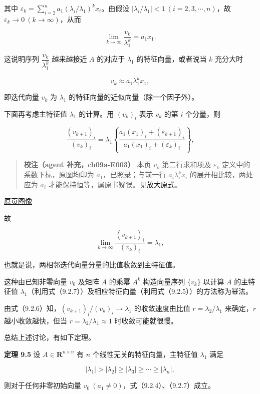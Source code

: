\documentclass[
  10pt,
  fontset=fandol]{ctexart}
\begin{document}
其中 \(\varepsilon_k=\displaystyle\sum_{i=2}^na_1(\lambda_i/\lambda_1)^kx_i\)。由假设 \(|\lambda_i/\lambda_1|<1\ (i=2,3,\cdots,n)\)，故 \(\varepsilon_k\to0\ (k\to\infty)\)，从而

\[
\lim_{k\to\infty}\frac{v_k}{\lambda_1^k}=a_1x_1.
\tag{9.2.4}
\]

这说明序列 \(\dfrac{v_k}{\lambda_1^k}\) 越来越接近 \(A\) 的对应于 \(\lambda_1\) 的特征向量，或者说当 \(k\) 充分大时

\[
v_k\approx a_1\lambda_1^kx_1,
\tag{9.2.5}
\]

即迭代向量 \(v_k\) 为 \(\lambda_1\) 的特征向量的近似向量（除一个因子外）。

下面再考虑主特征值 \(\lambda_1\) 的计算。用 \((v_k)_i\) 表示 \(v_k\) 的第 \(i\) 个分量，则

\[
\frac{(v_{k+1})_i}{(v_k)_i}=\lambda_1\left\{\frac{a_1(x_1)_i+(\varepsilon_{k+1})_i}{a_1(x_1)_i+(\varepsilon_k)_i}\right\},
\tag{9.2.6}
\]

\begin{quote}
\textbf{校注（agent 补充，ch09a-E003）} 本页 \(v_k\) 第二行求和项及 \(\varepsilon_k\) 定义中的系数下标，原图均印为 \(a_1\)，已照录；与前一行 \(a_i\lambda_i^kx_i\) 的展开相比较，两处应为 \(a_i\) 才能保持恒等，属原书疑误。见\href{../assets/ch09a/review-p235-power-expansion.png}{放大原式}。
\end{quote}

\href{../../source-images/pdf-236.jpeg}{原页图像}

故

\[
\lim_{k\to\infty}\frac{(v_{k+1})_i}{(v_k)_i}=\lambda_1,
\tag{9.2.7}
\]

也就是说，两相邻迭代向量分量的比值收敛到主特征值。

这种由已知非零向量 \(v_0\) 及矩阵 \(A\) 的乘幂 \(A^k\) 构造向量序列 \(\{v_k\}\) 以计算 \(A\) 的主特征值 \(\lambda_1\)（利用式（9.2.7））及相应特征向量（利用式（9.2.5））的方法称为幂法。

由式（9.2.6）知，\((v_{k+1})_i/(v_k)_i\to\lambda_1\) 的收敛速度由比值 \(r=\lambda_2/\lambda_1\) 来确定，\(r\) 越小收敛越快，但当 \(r=\lambda_2/\lambda_1\approx1\) 时收敛可能就很慢。

总结上述讨论，有如下定理。

\textbf{定理 9.5} 设 \(A\in\mathbf R^{n\times n}\) 有 \(n\) 个线性无关的特征向量，主特征值 \(\lambda_1\) 满足

\[
|\lambda_1|>|\lambda_2|\geq|\lambda_3|\geq\cdots\geq|\lambda_n|,
\]

则对于任何非零初始向量 \(v_0\ (a_1\ne0)\)，式（9.2.4）、（9.2.7）成立。
\end{document}

